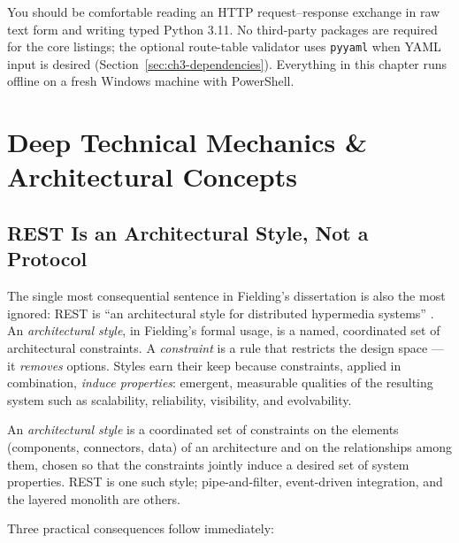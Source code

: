 You should be comfortable reading an HTTP request--response exchange in raw text
form and writing typed Python 3.11. No third-party packages are required for the
core listings; the optional route-table validator uses \texttt{pyyaml} when YAML
input is desired (Section~\ref{sec:ch3-dependencies}). Everything in this chapter
runs offline on a fresh Windows machine with PowerShell.

\section{Deep Technical Mechanics \& Architectural Concepts}
\label{sec:ch3-mechanics}

\subsection{REST Is an Architectural Style, Not a Protocol}

The single most consequential sentence in Fielding's dissertation is also the most
ignored: REST is ``an architectural style for distributed hypermedia systems''
\cite{fielding2000rest}. An \emph{architectural style}, in Fielding's formal usage,
is a named, coordinated set of architectural constraints. A \emph{constraint} is a
rule that restricts the design space --- it \emph{removes} options. Styles earn
their keep because constraints, applied in combination, \emph{induce properties}:
emergent, measurable qualities of the resulting system such as scalability,
reliability, visibility, and evolvability.

\begin{definition}
An \emph{architectural style} is a coordinated set of constraints on the elements
(components, connectors, data) of an architecture and on the relationships among
them, chosen so that the constraints jointly induce a desired set of system
properties. REST is one such style; pipe-and-filter, event-driven integration, and
the layered monolith are others.
\end{definition}

Three practical consequences follow immediately:

